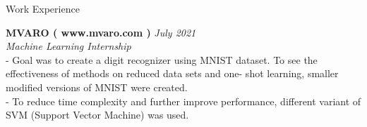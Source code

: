 \documentclass{resume} %
\begin{document}
\begin{rSection}{Work Experience}

{\bf MVARO ( www.mvaro.com )} \hfill {\em July 2021\\} 
{\textit{Machine Learning Internship}}
\\- Goal was to create a digit recognizer using MNIST dataset. To see the effectiveness of methods on reduced data sets and one- shot learning, smaller modified versions of MNIST were created. 
\\- To reduce time complexity and further improve performance, different variant of SVM (Support Vector Machine) was used.

\end{rSection}
\end{document}
